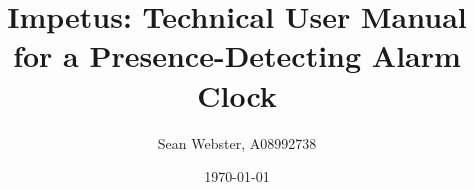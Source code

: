 \documentclass[12pt,letterpaper]{report}
\begin{document}
\title{Impetus: Technical User Manual for a Presence-Detecting Alarm
  Clock}
\author{Sean Webster, A08992738}
\date{\today}
\maketitle

\tableofcontents










\end{document}
